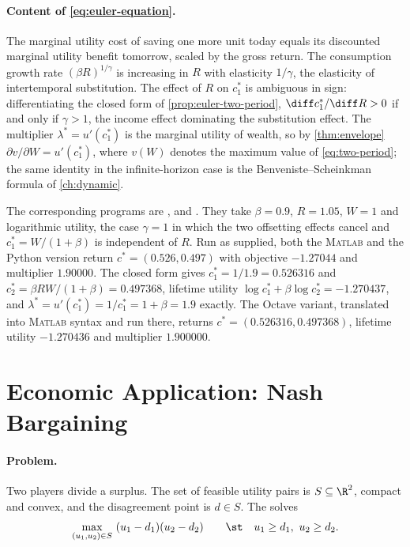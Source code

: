 \paragraph{Content of \eqref{eq:euler-equation}.} The marginal utility cost of
saving one more unit today equals its discounted marginal utility benefit
tomorrow, scaled by the gross return. The consumption growth rate
$(\beta R)^{1/\gamma}$ is increasing in $R$ with elasticity $1/\gamma$, the
elasticity of intertemporal substitution. The effect of $R$ on $c_1^\ast$ is
ambiguous in sign: differentiating the closed form of
\autoref{prop:euler-two-period}, $\diff c_1^\ast/\diff R>0$ if and only if
$\gamma>1$, the income effect dominating the substitution effect. The multiplier
$\lambda^\ast=u'(c_1^\ast)$ is the marginal utility of wealth, so by
\autoref{thm:envelope} $\partial v/\partial W=u'(c_1^\ast)$, where $v(W)$ denotes
the maximum value of \eqref{eq:two-period}; the same identity in the
infinite-horizon case is the Benveniste--Scheinkman formula of
\autoref{ch:dynamic}.

The corresponding programs are ,
 and
\autocite[slides 37--40]{fukuda2026optimization}. They take $\beta=0.9$,
$R=1.05$, $W=1$ and logarithmic utility, the case $\gamma=1$ in which the two
offsetting effects cancel and $c_1^\ast=W/(1+\beta)$ is independent of $R$. Run
as supplied, both the \textsc{Matlab} and the Python version return
$c^\ast=(0.526,0.497)$ with objective $-1.27044$ and multiplier $1.90000$. The
closed form gives $c_1^\ast=1/1.9=0.526316$ and
$c_2^\ast=\beta R W/(1+\beta)=0.497368$, lifetime utility
$\log c_1^\ast+\beta\log c_2^\ast=-1.270437$, and
$\lambda^\ast=u'(c_1^\ast)=1/c_1^\ast=1+\beta=1.9$ exactly. The Octave variant,
translated into \textsc{Matlab} syntax and run there, returns
$c^\ast=(0.526316,0.497368)$, lifetime utility $-1.270436$ and multiplier
$1.900000$.

\section{Economic Application: Nash Bargaining}\label{sec:opt-nash}

\paragraph{Problem.} Two players divide a surplus. The set of feasible utility
pairs is $S\subseteq\R^2$, compact and convex, and the disagreement point is
$d\in S$. The  solves
\begin{equation}\label{eq:nash-bargaining}
	\max_{(u_1,u_2)\in S}\ (u_1-d_1)(u_2-d_2)
	\qquad\st\quad u_1\geq d_1,\ u_2\geq d_2 .
\end{equation}

